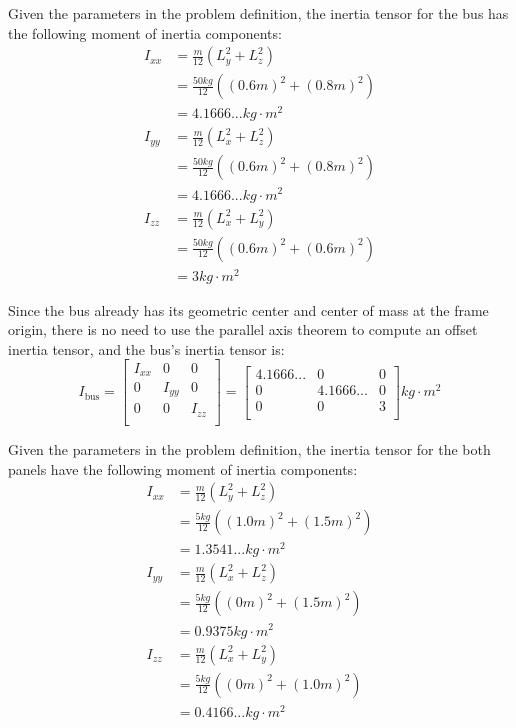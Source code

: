 \documentclass[titlepage]{article}
\begin{document}
Given the parameters in the problem definition, the inertia tensor for the bus has the following moment of inertia components:
\begin{equation}
	\begin{split}
		I_{xx}&=\frac{m}{12}\left(L_y^2+L_z^2\right) \\
		&=\frac{50kg}{12}\left((0.6m)^2+(0.8m)^2\right) \\
		&=4.1666... kg\cdot m^2
		\\
		I_{yy}&=\frac{m}{12}\left(L_x^2+L_z^2\right) \\
		&=\frac{50kg}{12}\left((0.6m)^2+(0.8m)^2\right) \\
		&=4.1666... kg\cdot m^2
		\\
		I_{zz}&=\frac{m}{12}\left(L_x^2+L_y^2\right) \\
		&=\frac{50kg}{12}\left((0.6m)^2+(0.6m)^2\right) \\
		&=3 kg\cdot m^2
	\end{split}
\end{equation}
\begin{mdframed}[linewidth=1pt, innertopmargin=10pt, innerbottommargin=10pt]
	Since the bus already has its geometric center and center of mass at the frame origin, there is no need to use the parallel axis theorem to compute an offset inertia tensor, and the bus's inertia tensor is:
	\begin{equation}
		I_{\text{bus}}=
		\begin{bmatrix}
			I_{xx} & 0 & 0 \\
			0 & I_{yy} & 0 \\
			0 & 0 & I_{zz} \\
		\end{bmatrix}=
		\begin{bmatrix}
			4.1666... & 0 & 0 \\
			0 & 4.1666... & 0 \\
			0 & 0 & 3 \\
		\end{bmatrix}kg\cdot m^2
	\end{equation}
\end{mdframed}

Given the parameters in the problem definition, the inertia tensor for the both panels have the following moment of inertia components:
\begin{equation}
	\begin{split}
		I_{xx}&=\frac{m}{12}\left(L_y^2+L_z^2\right) \\
		&=\frac{5kg}{12}\left((1.0m)^2+(1.5m)^2\right) \\
		&=1.3541... kg\cdot m^2
		\\
		I_{yy}&=\frac{m}{12}\left(L_x^2+L_z^2\right) \\
		&=\frac{5kg}{12}\left((0m)^2+(1.5m)^2\right) \\
		&=0.9375 kg\cdot m^2
		\\
		I_{zz}&=\frac{m}{12}\left(L_x^2+L_y^2\right) \\
		&=\frac{5kg}{12}\left((0m)^2+(1.0m)^2\right) \\
		&=0.4166... kg\cdot m^2
	\end{split}
\end{equation}
\end{document}
